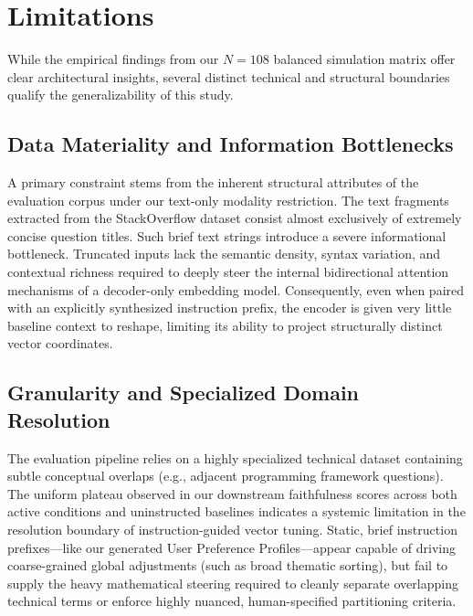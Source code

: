 \section{Limitations}
\label{sec:limitations}

While the empirical findings from our $N=108$ balanced simulation matrix offer clear architectural insights, several distinct technical and structural boundaries qualify the generalizability of this study.

\subsection{Data Materiality and Information Bottlenecks}
A primary constraint stems from the inherent structural attributes of the evaluation corpus under our text-only modality restriction. 
The text fragments extracted from the StackOverflow dataset consist almost exclusively of extremely concise question titles. 
Such brief text strings introduce a severe informational bottleneck. 
Truncated inputs lack the semantic density, syntax variation, and contextual richness required to deeply steer the internal bidirectional attention mechanisms of a decoder-only embedding model. 
Consequently, even when paired with an explicitly synthesized instruction prefix, the encoder is given very little baseline context to reshape, limiting its ability to project structurally distinct vector coordinates.

\subsection{Granularity and Specialized Domain Resolution}
The evaluation pipeline relies on a highly specialized technical dataset containing subtle conceptual overlaps (e.g., adjacent programming framework questions). 
The uniform plateau observed in our downstream faithfulness scores across both active conditions and uninstructed baselines indicates a systemic limitation in the resolution boundary of instruction-guided vector tuning. 
Static, brief instruction prefixes—like our generated User Preference Profiles—appear capable of driving coarse-grained global adjustments (such as broad thematic sorting), but fail to supply the heavy mathematical steering required to cleanly separate overlapping technical terms or enforce highly nuanced, human-specified partitioning criteria.

